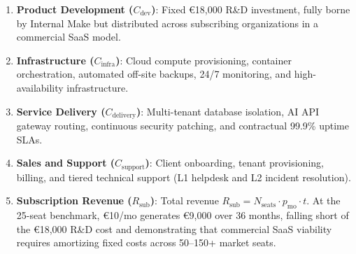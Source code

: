 \begin{enumerate}[itemsep=0.5pt,topsep=1.5pt,parsep=0pt,label=\arabic*.]
	\item \textbf{Product Development ($C_{\text{dev}}$)}: Fixed €18,000 R\&D investment, fully borne by Internal Make but distributed across subscribing organizations in a commercial SaaS model.
	\item \textbf{Infrastructure ($C_{\text{infra}}$)}: Cloud compute provisioning, container orchestration, automated off-site backups, 24/7 monitoring, and high-availability infrastructure.
	\item \textbf{Service Delivery ($C_{\text{delivery}}$)}: Multi-tenant database isolation, AI API gateway routing, continuous security patching, and contractual 99.9\% uptime SLAs.
	\item \textbf{Sales and Support ($C_{\text{support}}$)}: Client onboarding, tenant provisioning, billing, and tiered technical support (L1 helpdesk and L2 incident resolution).
	\item \textbf{Subscription Revenue ($R_{\text{sub}}$)}: Total revenue $R_{\text{sub}} = N_{\text{seats}} \cdot p_{\text{mo}} \cdot t$. At the 25-seat benchmark, €10/mo generates €9,000 over 36 months, falling short of the €18,000 R\&D cost and demonstrating that commercial SaaS viability requires amortizing fixed costs across 50--150+ market seats.
\end{enumerate}

